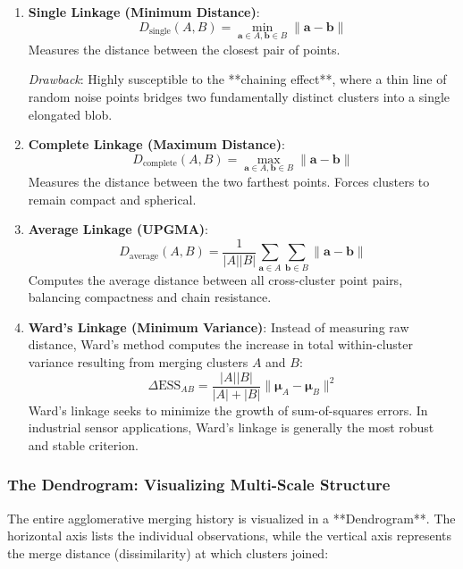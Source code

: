 \begin{enumerate}
    \item \textbf{Single Linkage (Minimum Distance)}:
    \begin{equation}
    D_{\text{single}}(A, B) = \min_{\mathbf{a} \in A, \mathbf{b} \in B} \|\mathbf{a} - \mathbf{b}\|\label{eq:single_linkage}
    \end{equation}
    Measures the distance between the closest pair of points. 
    
    \textit{Drawback}: Highly susceptible to the **chaining effect**, where a thin line of random noise points bridges two fundamentally distinct clusters into a single elongated blob.
    
    \item \textbf{Complete Linkage (Maximum Distance)}:
    \begin{equation}
    D_{\text{complete}}(A, B) = \max_{\mathbf{a} \in A, \mathbf{b} \in B} \|\mathbf{a} - \mathbf{b}\|\label{eq:complete_linkage}
    \end{equation}
    Measures the distance between the two farthest points. Forces clusters to remain compact and spherical.
    
    \item \textbf{Average Linkage (UPGMA)}:
    \begin{equation}
    D_{\text{average}}(A, B) = \frac{1}{|A||B|} \sum_{\mathbf{a} \in A} \sum_{\mathbf{b} \in B} \|\mathbf{a} - \mathbf{b}\|\label{eq:average_linkage}
    \end{equation}
    Computes the average distance between all cross-cluster point pairs, balancing compactness and chain resistance.
    
    \item \textbf{Ward's Linkage (Minimum Variance)}:
    Instead of measuring raw distance, Ward's method computes the increase in total within-cluster variance resulting from merging clusters $A$ and $B$:
    \begin{equation}
    \Delta \text{ESS}_{AB} = \frac{|A||B|}{|A| + |B|} \|\boldsymbol{\mu}_A - \boldsymbol{\mu}_B\|^2\label{eq:ward_linkage}
    \end{equation}
    Ward's linkage seeks to minimize the growth of sum-of-squares errors. In industrial sensor applications, Ward's linkage is generally the most robust and stable criterion.
\end{enumerate}

\subsubsection{The Dendrogram: Visualizing Multi-Scale Structure}
The entire agglomerative merging history is visualized in a **Dendrogram**. The horizontal axis lists the individual observations, while the vertical axis represents the merge distance (dissimilarity) at which clusters joined:

